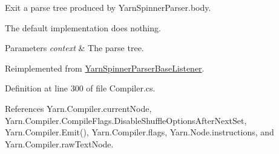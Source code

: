 Exit a parse tree produced by Yarn\-Spinner\-Parser.\-body. 

The default implementation does nothing.


\begin{DoxyParams}{Parameters}
{\em context} & The parse tree.\\
\hline
\end{DoxyParams}


Reimplemented from \hyperlink{a00173_ab0f6c8acd95f6213546c6f1f8370fd67}{Yarn\-Spinner\-Parser\-Base\-Listener}.



Definition at line 300 of file Compiler.\-cs.



References Yarn.\-Compiler.\-current\-Node, Yarn.\-Compiler.\-Compile\-Flags.\-Disable\-Shuffle\-Options\-After\-Next\-Set, Yarn.\-Compiler.\-Emit(), Yarn.\-Compiler.\-flags, Yarn.\-Node.\-instructions, and Yarn.\-Compiler.\-raw\-Text\-Node.


